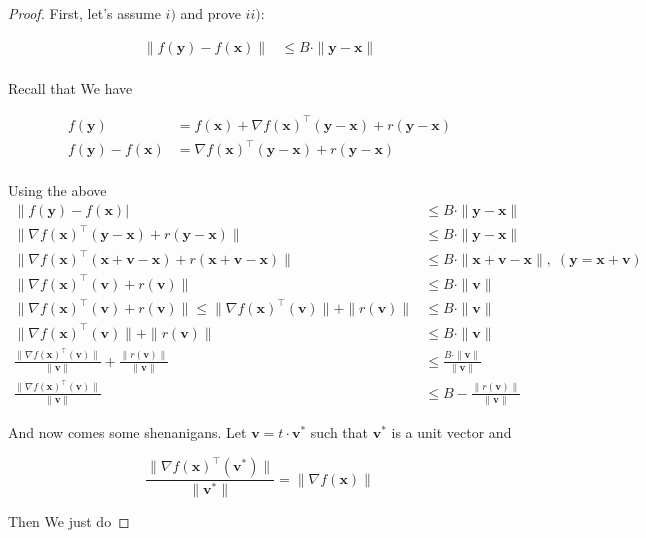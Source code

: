 \documentclass{article}
\begin{document}
		\begin{proof}
			First, let's assume $i)$ and prove $ii)$:
			
			\begin{align}
				\| f(\mathbf{y}) - f(\mathbf{x}) \|& \le B\cdot \|\mathbf{y-x}\| \\
			\end{align}
			
			Recall that We have 
			
			\begin{align*}
				f(\mathbf{y}) &= f(\mathbf{x}) + \nabla f\mathbf{(x)^\top(y-x)} + r(\mathbf{y-x}) \\
				f(\mathbf{y}) -  f(\mathbf{x}) &= \nabla f\mathbf{(x)^\top(y-x)} + r(\mathbf{y-x}) \\
			\end{align*}
			
			Using the above
			\begin{align*}
				\|f(\mathbf{y}) - f(\mathbf{x})|& \le B\cdot \|\mathbf{y-x}\| \\
				\| \nabla f\mathbf{(x)^\top(y-x)} + r(\mathbf{y-x}) \| &\le B\cdot \|\mathbf{y-x}\| \\
				\| \nabla f\mathbf{(x)^\top(x+v-x)} + r(\mathbf{x+v-x}) \| & \le B\cdot \| \mathbf{x+v-x} \|, \; (\mathbf{y = x+v}) \\
				\| \nabla f\mathbf{(x)^\top(v)} + r(\mathbf{v}) \| & \le B\cdot \| \mathbf{v} \|  \\
				\| \nabla f\mathbf{(x)^\top(v)} + r(\mathbf{v}) \| \le \| \nabla f\mathbf{(x)^\top(v)} \| + \| r(\mathbf{v})  \|  &\le B\cdot \| \mathbf{v} \|  \\
				\| \nabla f\mathbf{(x)^\top(v)} \| + \| r(\mathbf{v})  \|  &\le B\cdot \| \mathbf{v} \|  \\
				\frac{\| \nabla f\mathbf{(x)^\top(v)} \|}{\| \mathbf{v} \|} + \frac{\| r(\mathbf{v})  \|}{\| \mathbf{v} \|}  &\le \frac{B\cdot \| \mathbf{v} \|}{\| \mathbf{v} \|}  \\				
				\frac{\| \nabla f\mathbf{(x)^\top(v)} \|}{\| \mathbf{v} \|}  &\le B - \frac{\| r(\mathbf{v})  \|}{\| \mathbf{v} \|}  
			\end{align*}
			
			And now comes some shenanigans. Let $\mathbf{v} = t\cdot\mathbf{v}^*$ such that $\mathbf{v^*}$ is a unit vector and 
			
			\[ \frac{\| \nabla f\mathbf{(x)^\top(v^*)} \|}{\| \mathbf{v^*} \|} = \| \nabla f\mathbf{(x)} \| \]
			
			Then We just do 
			

\end{proof}
\end{document}
